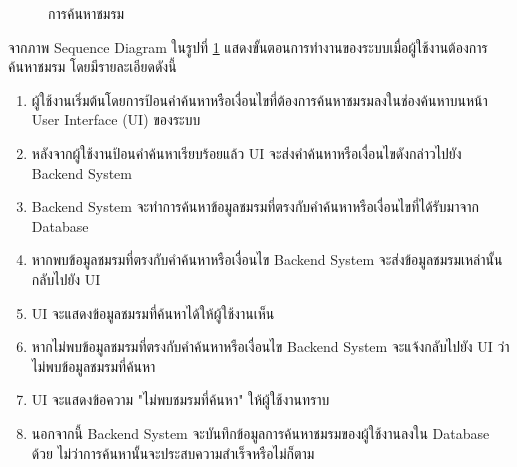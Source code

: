 \documentclass[14pt,oneside,openright,a4paper]{cpe-thai-project}
\begin{document}
  \begin{figure}[!h]\centering
    \setlength{\fboxrule}{0.5mm} %
    \setlength{\fboxsep}{0.5cm}
    \caption{การค้นหาชมรม}\label{fig:Seacrh club}
  \end{figure}

  จากภาพ Sequence Diagram ในรูปที่ \ref{fig:Seacrh club} แสดงขั้นตอนการทำงานของระบบเมื่อผู้ใช้งานต้องการค้นหาชมรม โดยมีรายละเอียดดังนี้
  \begin{enumerate}
    \item ผู้ใช้งานเริ่มต้นโดยการป้อนคำค้นหาหรือเงื่อนไขที่ต้องการค้นหาชมรมลงในช่องค้นหาบนหน้า User Interface (UI) ของระบบ
    \item หลังจากผู้ใช้งานป้อนคำค้นหาเรียบร้อยแล้ว UI จะส่งคำค้นหาหรือเงื่อนไขดังกล่าวไปยัง Backend System
    \item Backend System จะทำการค้นหาข้อมูลชมรมที่ตรงกับคำค้นหาหรือเงื่อนไขที่ได้รับมาจาก Database
    \item หากพบข้อมูลชมรมที่ตรงกับคำค้นหาหรือเงื่อนไข Backend System จะส่งข้อมูลชมรมเหล่านั้นกลับไปยัง UI
    \item UI จะแสดงข้อมูลชมรมที่ค้นหาได้ให้ผู้ใช้งานเห็น
    \item หากไม่พบข้อมูลชมรมที่ตรงกับคำค้นหาหรือเงื่อนไข Backend System จะแจ้งกลับไปยัง UI ว่าไม่พบข้อมูลชมรมที่ค้นหา
    \item UI จะแสดงข้อความ "ไม่พบชมรมที่ค้นหา" ให้ผู้ใช้งานทราบ
    \item นอกจากนี้ Backend System จะบันทึกข้อมูลการค้นหาชมรมของผู้ใช้งานลงใน Database ด้วย ไม่ว่าการค้นหานั้นจะประสบความสำเร็จหรือไม่ก็ตาม
  \end{enumerate}
\end{document}
